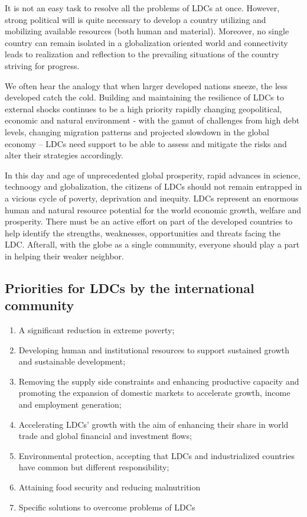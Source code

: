 \documentclass[
  openany]{book}
\providecommand{\tightlist}{%
  \setlength{\itemsep}{0pt}\setlength{\parskip}{0pt}}
\begin{document}
It is not an easy task to resolve all the problems of LDCs at once. However, strong political will is quite necessary to develop a country utilizing and mobilizing available resources (both human and material). Moreover, no single country can remain isolated in a globalization oriented world and connectivity leads to realization and reflection to the prevailing situations of the country striving for progress.

We often hear the analogy that when larger developed nations sneeze, the less developed catch the cold. Building and maintaining the resilience of LDCs to external shocks continues to be a high priority rapidly changing geopolitical, economic and natural environment - with the gamut of challenges from high debt levels, changing migration patterns and projected slowdown in the global economy -- LDCs need support to be able to assess and mitigate the risks and alter their strategies accordingly.

In this day and age of unprecedented global prosperity, rapid advances in science, technoogy and globalization, the citizens of LDCs should not remain entrapped in a vicious cycle of poverty, deprivation and inequity. LDCs represent an enormous human and natural resource potential for the world economic growth, welfare and prosperity. There must be an active effort on part of the developed countries to help identify the strengths, weaknesses, opportunities and threats facing the LDC. Afterall, with the globe as a single community, everyone should play a part in helping their weaker neighbor.

\hypertarget{priorities-for-ldcs-by-the-international-community}{%
\subsection{Priorities for LDCs by the international community}\label{priorities-for-ldcs-by-the-international-community}}

\begin{enumerate}
\def\labelenumi{\arabic{enumi}.}
\tightlist
\item
  A significant reduction in extreme poverty;
\item
  Developing human and institutional resources to support sustained growth and sustainable development;
\item
  Removing the supply side constraints and enhancing productive capacity and promoting the expansion of domestic markets to accelerate growth, income and employment generation;
\item
  Accelerating LDCs' growth with the aim of enhancing their share in world trade and global financial and investment flows;
\item
  Environmental protection, accepting that LDCs and industrialized countries have common but different responsibility;
\item
  Attaining food security and reducing malnutrition
\item
  Specific solutions to overcome problems of LDCs
\end{enumerate}
\end{document}
